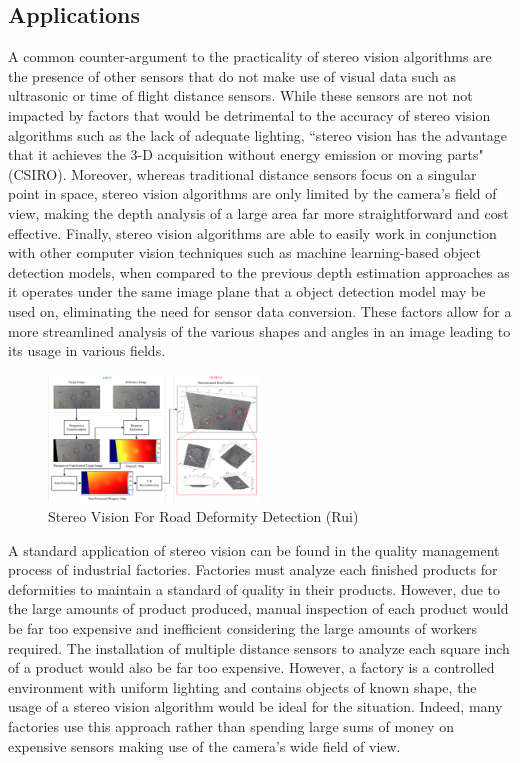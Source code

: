 \documentclass[11pt]{scrartcl}
\begin{document}
\subsection{Applications}
A common counter-argument to the practicality of stereo vision algorithms are the presence of other sensors that do not make use of visual data such
as ultrasonic or time of flight distance sensors. While these sensors are not
not impacted by factors that would be detrimental to the accuracy of stereo
vision algorithms such as the lack of adequate lighting,
``stereo vision has the advantage that it achieves the 3-D acquisition without
energy emission or moving parts" (CSIRO). Moreover,
whereas traditional distance sensors focus on a singular point in space, stereo vision
algorithms are only limited by the camera's field of view, making the depth analysis
of a large area far more straightforward and cost effective. Finally, stereo vision algorithms are able
to easily work in conjunction with other
computer vision techniques such as machine learning-based object detection
models, when compared to the previous depth estimation approaches as it operates under the same image plane that a object detection model may be used on, eliminating the need for sensor data conversion.
These factors allow for a more streamlined analysis of the
various shapes and angles in an image leading to its usage in various fields.
\\
\begin{figure}
  \centering
  \includegraphics[width=0.5\textwidth]{img1.png}
  \caption{\label{fig:frog1}Stereo Vision For Road Deformity Detection (Rui)}
\end{figure}

A standard application of stereo vision can be found in the quality
management process of industrial factories. Factories must analyze each
finished products for deformities to maintain a standard of quality in their
products. However, due to the large amounts of product produced, 
manual inspection of each product would be far too expensive and inefficient considering the large amounts of workers required. The installation of multiple
distance sensors to analyze each square inch of a product would also be far too expensive.
However, a factory is a controlled environment with uniform lighting and contains objects
of known shape, the usage of a stereo vision algorithm would be ideal for the situation. Indeed, many factories use this approach rather than spending large sums of money on expensive sensors making use of the camera's wide field of view. 
 \\
\end{document}
